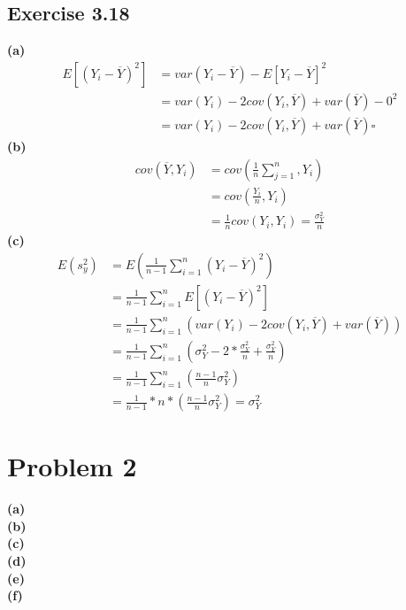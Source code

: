 \documentclass[fleqn]{article}
\begin{document}
\begin{adjustwidth}{-2cm}{-2cm}
\subsection{Exercise 3.18}
\textbf{(a)}
\begin{align*}
E\left[\left(Y_{i} - \overline{Y}\right)^{2}\right] &= var\left(Y_{i} - \overline{Y}\right) - E\left[Y_{i} - \overline{Y}\right]^{2}\\
&= var\left(Y_{i}\right) - 2cov\left(Y_{i}, \overline{Y}\right) + var\left(\overline{Y}\right) - 0^{2} \\
&= var\left(Y_{i}\right) - 2cov\left(Y_{i}, \overline{Y}\right) + var\left(\overline{Y}\right) \square
\end{align*}
\textbf{(b)}
\begin{align*}
cov\left(\overline{Y}, Y_{i}\right) &= cov\left(\frac{1}{n}\sum_{j=1}^{n}, Y_{i}\right)\\
&= cov\left(\frac{Y_{i}}{n}, Y_{i}\right)\\
&= \frac{1}{n}cov\left(Y_{i}, Y_{i}\right) = \frac{\sigma_{Y}^{2}}{n}
\end{align*}
\textbf{(c)}
\begin{align*}
E\left(s_{y}^{2}\right) &= E\left(\frac{1}{n-1}\sum_{i=1}^{n}\left(Y_{i} - \overline{Y}\right)^{2}\right)\\
&= \frac{1}{n-1}\sum_{i=1}^{n}E\left[\left(Y_{i} - \overline{Y}\right)^{2}\right]\\
&= \frac{1}{n-1}\sum_{i=1}^{n}\left(var\left(Y_{i}\right) - 2cov\left(Y_{i}, \overline{Y}\right) + var\left(\overline{Y}\right)\right)\\
&= \frac{1}{n-1}\sum_{i=1}^{n}\left(\sigma_{Y}^{2} - 2*\frac{\sigma_{Y}^{2}}{n} + \frac{\sigma_{Y}^{2}}{n}\right)\\
&= \frac{1}{n-1}\sum_{i=1}^{n}\left(\frac{n-1}{n}\sigma_{Y}^{2}\right)\\
&= \frac{1}{n-1}*n*\left(\frac{n-1}{n}\sigma_{Y}^{2}\right) = \sigma_{Y}^{2}
\end{align*}

\section{Problem 2}
\textbf{(a)}\\
\textbf{(b)}\\
\textbf{(c)}\\
\textbf{(d)}\\
\textbf{(e)}\\
\textbf{(f)}\\


\end{adjustwidth}
\end{document}
